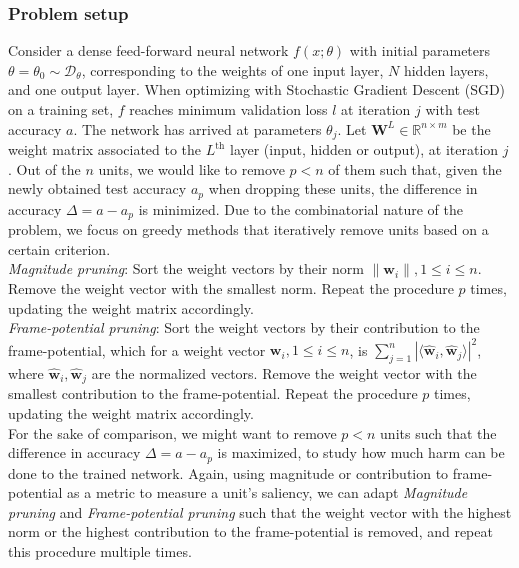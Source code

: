 \subsubsection*{Problem setup}
Consider a dense feed-forward neural network $f(x; \theta)$ with initial parameters $\theta = \theta_0 \sim \mathcal{D}_{\theta}$, corresponding to the weights of one input layer, $N$ hidden layers, and one output layer. When optimizing with Stochastic Gradient Descent (SGD) on a training set, $f$ reaches minimum validation loss $l$ at iteration $j$ with test accuracy $a$. The network has arrived at parameters $\theta_j$. Let $\mathbf{W}^L \in \mathbb{R}^{n \times m}$ be the weight matrix associated to the $L^{\text{th}}$ layer (input, hidden or output), at iteration $j$. Out of the $n$ units, we would like to remove $p < n$ of them such that, given the newly obtained test accuracy $a_p$ when dropping these units, the difference in accuracy $\Delta = a - a_p$ is minimized. Due to the combinatorial nature of the problem, we focus on greedy methods that iteratively remove units based on a certain criterion.  \\

\textit{Magnitude pruning}: Sort the weight vectors by their norm $\|\mathbf{w}_i\|, 1 \leq i \leq n$. Remove the weight vector with the smallest norm. Repeat the procedure $p$ times, updating the weight matrix accordingly. \\

\textit{Frame-potential pruning}: Sort the weight vectors by their contribution to the frame-potential, which for a weight vector $\mathbf{w}_i, 1 \leq i \leq n$, is $\sum\limits_{j=1}^n | \langle \hat{\mathbf{w}}_i, \hat{\mathbf{w}}_j \rangle |^2$, where $\hat{\mathbf{w}}_i, \hat{\mathbf{w}}_j$ are the normalized vectors. Remove the weight vector with the smallest contribution to the frame-potential. Repeat the procedure $p$ times, updating the weight matrix accordingly. \\

For the sake of comparison, we might want to remove $p < n$ units such that the difference in accuracy $\Delta = a - a_p$ is maximized, to study how much harm can be done to the trained network. Again, using magnitude or contribution to frame-potential as a metric to measure a unit's saliency, we can adapt \textit{Magnitude pruning} and \textit{Frame-potential pruning} such that the weight vector with the highest norm or the highest contribution to the frame-potential is removed, and repeat this procedure multiple times. \\

